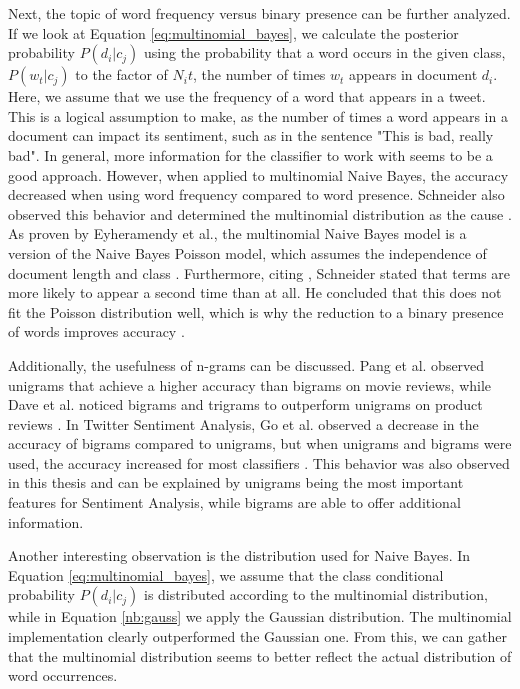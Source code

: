 Next, the topic of word frequency versus binary presence can be further analyzed. If we look at Equation \eqref{eq:multinomial_bayes}, we calculate the posterior probability $P(d_i|c_j)$ using the probability that a word occurs in the given class, $P(w_t|c_j)$ to the factor of $N_it$, the number of times $w_t$ appears in document $d_i$. Here, we assume that we use the frequency of a word that appears in a tweet. This is a logical assumption to make, as the number of times a word appears in a document can impact its sentiment, such as in the sentence "This is bad, really bad". In general, more information for the classifier to work with seems to be a good approach. However, when applied to multinomial Naive Bayes, the accuracy decreased when using word frequency compared to word presence. Schneider also observed this behavior and determined the multinomial distribution as the cause \cite{nb_freq}. As proven by Eyheramendy et al., the multinomial Naive Bayes model is a version of the Naive Bayes Poisson model, which assumes the independence of document length and class \cite{poisson}. Furthermore, citing \cite{poisson_words}, Schneider stated that terms are more likely to appear a second time than at all. He concluded that this does not fit the Poisson distribution well, which is why the reduction to a binary presence of words improves accuracy \cite{nb_freq}.

Additionally, the usefulness of n-grams can be discussed. Pang et al. observed unigrams that achieve a higher accuracy than bigrams \cite{pang-etal-2002-thumbs} on movie reviews, while Dave et al. noticed bigrams and trigrams to outperform unigrams on product reviews \cite{dave-et-al}. In Twitter Sentiment Analysis, Go et al. observed a decrease in the accuracy of bigrams compared to unigrams, but when unigrams and bigrams were used, the accuracy increased for most classifiers \cite{GoBHaHua2009}. This behavior was also observed in this thesis and can be explained by unigrams being the most important features for Sentiment Analysis, while bigrams are able to offer additional information.

Another interesting observation is the distribution used for Naive Bayes. In Equation \eqref{eq:multinomial_bayes}, we assume that the class conditional probability $P(d_i|c_j)$ is distributed according to the multinomial distribution, while in Equation \eqref{nb:gauss} we apply the Gaussian distribution. The multinomial implementation clearly outperformed the Gaussian one. From this, we can gather that the multinomial distribution seems to better reflect the actual distribution of word occurrences.

